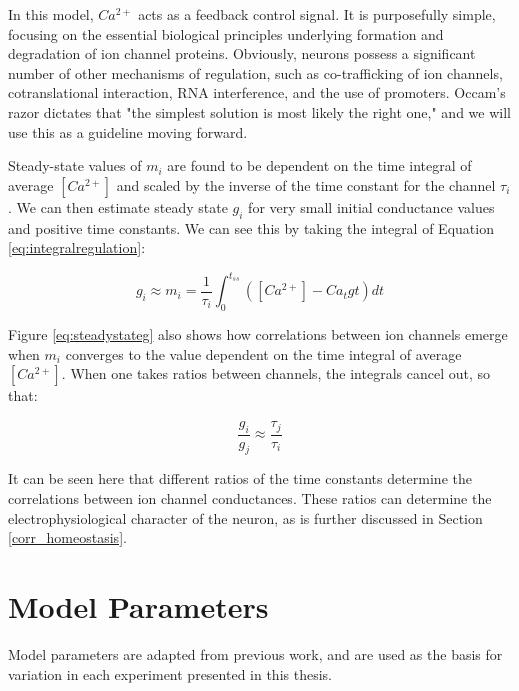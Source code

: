 In this model, $Ca^{2+}$ acts as a feedback control signal. It is purposefully simple, focusing on the essential biological principles underlying formation and degradation of ion channel proteins. Obviously, neurons possess a significant number of other mechanisms of regulation, such as co-trafficking of ion channels, cotranslational interaction, RNA interference, and the use of promoters\cite{oleary_cell_2014,shi_subunits_1996,vanoye_kcnq1/kcne1_2010,arcangeli_ion_2011,frank_endogenous_2011,zhang_recovery_2011}. Occam's razor dictates that "the simplest solution is most likely the right one," and we will use this as a guideline moving forward.

Steady-state values of $m_i$ are found to be dependent on the time integral of average $[Ca^{2+}]$ and scaled by the inverse of the time constant for the channel $\tau_i$. We can then estimate steady state $g_i$ for very small initial conductance values and positive time constants. We can see this by taking the integral of Equation \ref{eq:integralregulation}:

\begin{equation} \label{eq:steadystateg}
    g_i \approx m_i = \frac{1}{\tau_i} \int_{0}^{t_{ss}} ([Ca^{2+}] - Ca_tgt)dt
\end{equation}

Figure \ref{eq:steadystateg} also shows how correlations between ion channels emerge when $m_i$ converges to the value dependent on the time integral of average $[Ca^{2+}]$. When one takes ratios between channels, the integrals cancel out, so that:

\begin{equation}
    \frac{g_i}{g_j} \approx \frac{\tau_j}{\tau_i}
\end{equation}

It can be seen here that different ratios of the time constants determine the correlations between ion channel conductances. These ratios can determine the electrophysiological character of the neuron, as is further discussed in Section \ref{corr_homeostasis}.

\section{Model Parameters} \label{modelparameters}

Model parameters are adapted from previous work, and are used as the basis for variation in each experiment presented in this thesis\cite{prinz_alternative_2003,oleary_cell_2014,liu_model_1998}.

